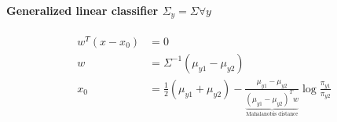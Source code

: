 \documentclass[MachineLearning]{subfiles}
\begin{document}
\paragraph{Generalized linear classifier \(\Sigma_y = \Sigma \forall y\)}
\begin{align}
w^T (x - x_0) &= 0\\
w &= \Sigma^{-1}(\mu_{y1}-\mu_{y2})\\
x_0 &= \frac{1}{2}(\mu_{y1}+\mu_{y2}) - \frac{\mu_{y1}-\mu_{y2}}{\underbrace{(\mu_{y1}-\mu_{y2})^T w}_{\text{Mahalanobis distance}}} \log\frac{\pi_{y1}}{\pi_{y2}}
\end{align}
\end{document}
